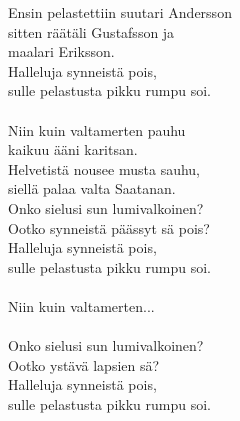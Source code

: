 
            Ensin pelastettiin suutari Andersson \\
            sitten räätäli Gustafsson ja \\
            maalari Eriksson. \\
            Halleluja synneistä pois, \\
            sulle pelastusta pikku rumpu soi. \\
\hspace{10mm} \\
            Niin kuin valtamerten pauhu \\
            kaikuu ääni karitsan. \\
            Helvetistä nousee musta sauhu, \\
            siellä palaa valta Saatanan. \\
            Onko sielusi sun lumivalkoinen? \\
            Ootko synneistä päässyt sä pois? \\
            Halleluja synneistä pois, \\
            sulle pelastusta pikku rumpu soi. \\
\hspace{10mm} \\
            Niin kuin valtamerten... \\
\hspace{10mm} \\
            Onko sielusi sun lumivalkoinen? \\
            Ootko ystävä lapsien sä? \\
            Halleluja synneistä pois, \\
            sulle pelastusta pikku rumpu soi. \\
